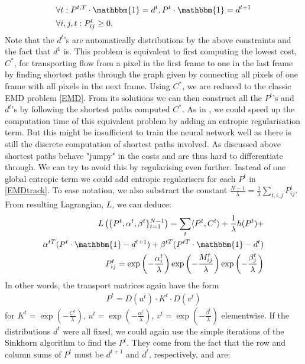 \documentclass{article}
\begin{document}
{\begin{align}
&\forall t: P^{t,T} \cdot \mathbbm{1} = d^t, P^t\cdot \mathbbm{1} = d^{t+1} \nonumber\\
&\forall i,j,t: P^t_{ij} \geq 0.\nonumber
\end{align}
Note that the $d^t$'s are automatically distributions by the above constraints and the fact that $d^1$ is. This problem is equivalent to first computing the lowest cost, $C^*$, for transporting flow from a pixel in the first frame to one in the last frame by finding shortest paths through the graph given by connecting all pixels of one frame with all pixels in the next frame. Using $C^*$, we are reduced to the classic EMD problem \ref{EMD}. From its solutions we can then construct all the $P^t$'s and $d^t$'s by following the shortest paths computed $C^*$. As in \cite{Cut13}, we could speed up the computation time of this equivalent problem by adding an entropic regularisation term. But this might be insufficient to train the neural network well as there is still the discrete computation of shortest paths involved. As discussed above shortest paths behave "jumpy" in the costs and are thus hard to differentiate through. We can try to avoid this by regularising even further. Instead of one global entropic term we could add entropic regularisers for each $P^t$ in \ref{EMDtrack}. To ease notation, we also substract the  constant $\frac{N-1}{\lambda} = \frac{1}{\lambda} \sum_{t, i, j} P^t_{ij}$. From resulting Lagrangian, $L$, we can deduce:
\begin{align*}
L\left(\{P^t, \alpha^t, \beta^t\}_{t=1}^{N-1}\right)
= \sum_{t} \langle P^t, C^t \rangle + \frac{1}{\lambda} h(P^t) + \\
\alpha^{t T} (P^t\cdot \mathbbm{1}- d^{t+1}) + \beta^{t T}(P^{tT} \cdot \mathbbm{1} - d^t) \\
P^t_{ij} = \exp\left(-\frac{\alpha_i^t}{\lambda}\right) \exp\left(-\frac{M^t_{ij}}{\lambda}\right) \exp\left(- \frac{\beta_j^t}{\lambda}\right)
\end{align*}
In other words, the transport matrices again have the form
\begin{align*}
P^t = D(u^t)\cdot K^t \cdot D(v^t) 
\end{align*}
for $K^t = \exp\left(-\frac{C^t}{\lambda}\right)$, $u^t = \exp\left(-\frac{\alpha^t}{\lambda}\right)$, \break $v^t=\exp\left(- \frac{\beta^t}{\lambda}\right)$ elementwise. If the distributions $d^t$ were all fixed, we could again use the simple iterations of the Sinkhorn algorithm \cite{Sink67} to find the $P^t$. They come from the fact that the row and column sums of $P^t$ must be $d^{t+1}$ and $d^t$, respectively, and are:
}
\end{document}
